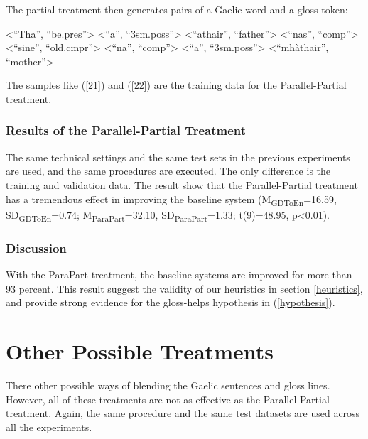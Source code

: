 \documentclass[a4paper]{article}
\begin{document}
The partial treatment then generates pairs of a Gaelic word and a gloss token: 
\begin{exe}
	\ex\label{22}
	\begin{xlist}
		\ex <``Tha'', ``be.pres''>
		\ex <``a'', ``3sm.poss''>
		\ex <``athair'', ``father''>
		\ex <``nas'', ``comp''>
		\ex <``sine'', ``old.cmpr''>
		\ex <``na'', ``comp''>
		\ex <``a'', ``3sm.poss''>
		\ex <``mh\`athair'', ``mother''>
	\end{xlist}
\end{exe}

The samples like (\ref{21}) and (\ref{22}) are the training data for the Parallel-Partial treatment. 

\subsubsection{Results of the Parallel-Partial Treatment}
The same technical settings and the same test sets in the previous experiments are used, and the same procedures are executed. 
The only difference is the training and validation data. The result show that the Parallel-Partial treatment has a tremendous effect in improving the baseline system (M\textsubscript{GDToEn}=16.59, SD\textsubscript{GDToEn}=0.74; M\textsubscript{ParaPart}=32.10, SD\textsubscript{ParaPart}=1.33; t(9)=48.95, p<0.01). 

\subsubsection{Discussion}
With the ParaPart treatment, the baseline systems are improved for more than 93 percent. This result suggest the validity of our heuristics in section \ref{heuristics}, and provide strong evidence for the gloss-helps hypothesis in (\ref{hypothesis}).      





\section{Other Possible Treatments}
There other possible ways of blending the Gaelic sentences and gloss lines. However, all of these treatments are not as effective as the Parallel-Partial treatment. Again, the same procedure and the same test datasets are used across all the experiments.    
\end{document}
